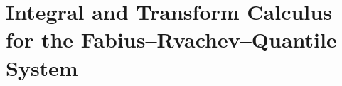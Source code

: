 \documentclass[11pt,oneside]{article}
\newcommand{\integrationreportreset}{%
  \clearpage
  \setcounter{section}{0}%
  \renewcommand{\thesection}{\arabic{section}}}
\theoremstyle{definition}
\theoremstyle{remark}
\newcommand{\fall}[2]{#1^{\underline{#2}}}
\newcommand{\1}{\mathbf 1}
\begin{document}
\integrationreportreset
\newcommand{\G}{G}
\newcommand{\Beta}{\operatorname{Beta}}
\newcommand{\tagnew}{\textsuperscript{\textcolor{oliveink}{\bfseries N}}}
\newcommand{\tagbase}{\textsuperscript{\textcolor{softgray}{\bfseries B}}}
\newcommand{\tagconj}{\textsuperscript{\textcolor{oliveink}{\bfseries C}}}
\newcommand{\Tn}{T_n}
\newcommand{\binomc}[2]{\binom{#1}{#2}}
\part{Integral and Transform Calculus for the Fabius--Rvachev--Quantile System}
\end{document}
